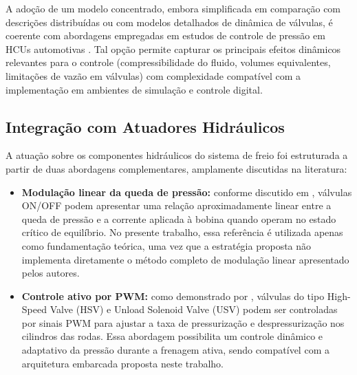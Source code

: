 A adoção de um modelo concentrado, embora simplificada em comparação com descrições distribuídas ou com modelos detalhados de dinâmica de válvulas, é coerente com abordagens empregadas em estudos de controle de pressão em HCUs automotivas \cite{HouhuaJing2022,ZengYangHuang2023,Lv2014}. Tal opção permite capturar os principais efeitos dinâmicos relevantes para o controle (compressibilidade do fluido, volumes equivalentes, limitações de vazão em válvulas) com complexidade compatível com a implementação em ambientes de simulação e controle digital.


\subsection{Integração com Atuadores Hidráulicos}
\label{sec:controle-4-1-1}

A atuação sobre os componentes hidráulicos do sistema de freio foi estruturada a partir de duas abordagens complementares, amplamente discutidas na literatura:

\begin{itemize} 

    \item \textbf{Modulação linear da queda de pressão:} conforme discutido em , válvulas ON/OFF podem apresentar uma relação aproximadamente linear entre a queda de pressão e a corrente aplicada à bobina quando operam no estado crítico de equilíbrio. No presente trabalho, essa referência é utilizada apenas como fundamentação teórica, uma vez que a estratégia proposta não implementa diretamente o método completo de modulação linear apresentado pelos autores.
    \item \textbf{Controle ativo por PWM:} como demonstrado por , válvulas do tipo High-Speed Valve (HSV) e Unload Solenoid Valve (USV) podem ser controladas por sinais PWM para ajustar a taxa de pressurização e despressurização nos cilindros das rodas. Essa abordagem possibilita um controle dinâmico e adaptativo da pressão durante a frenagem ativa, sendo compatível com a arquitetura embarcada proposta neste trabalho. 
\end{itemize}


